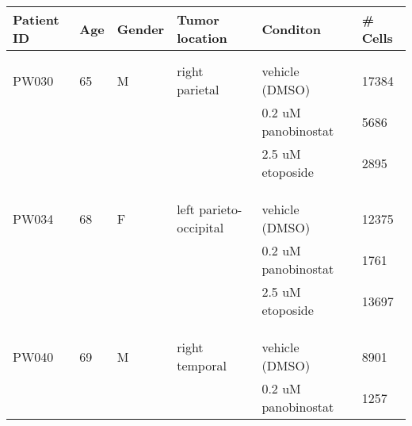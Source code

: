 \centering
\begin{tabular}[t]{llllll}
\toprule
Patient ID & Age & Gender & Tumor location & Conditon & \# Cells\\
\midrule
\cellcolor{gray!6}{PW029} & \cellcolor{gray!6}{52} & \cellcolor{gray!6}{F} & \cellcolor{gray!6}{splenial extension into left parietal} & \cellcolor{gray!6}{vehicle (DMSO)} & \cellcolor{gray!6}{1433}\\
\cellcolor{gray!6}{} & \cellcolor{gray!6}{} & \cellcolor{gray!6}{} & \cellcolor{gray!6}{} & \cellcolor{gray!6}{2.5 uM etoposide} & \cellcolor{gray!6}{3739}\\
PW030 & 65 & M & right parietal & vehicle (DMSO) & 17384\\
 &  &  &  & 0.2 uM panobinostat & 5686\\
 &  &  &  & 2.5 uM etoposide & 2895\\
\cellcolor{gray!6}{PW032} & \cellcolor{gray!6}{61} & \cellcolor{gray!6}{M} & \cellcolor{gray!6}{left frontal} & \cellcolor{gray!6}{vehicle (DMSO)} & \cellcolor{gray!6}{5003}\\
\cellcolor{gray!6}{} & \cellcolor{gray!6}{} & \cellcolor{gray!6}{} & \cellcolor{gray!6}{} & \cellcolor{gray!6}{0.2 uM panobinostat} & \cellcolor{gray!6}{738}\\
\cellcolor{gray!6}{} & \cellcolor{gray!6}{} & \cellcolor{gray!6}{} & \cellcolor{gray!6}{} & \cellcolor{gray!6}{2.5 uM etoposide} & \cellcolor{gray!6}{1034}\\
PW034 & 68 & F & left parieto-occipital & vehicle (DMSO) & 12375\\
 &  &  &  & 0.2 uM panobinostat & 1761\\
 &  &  &  & 2.5 uM etoposide & 13697\\
\cellcolor{gray!6}{PW036} & \cellcolor{gray!6}{56} & \cellcolor{gray!6}{M} & \cellcolor{gray!6}{right temporal} & \cellcolor{gray!6}{vehicle (DMSO)} & \cellcolor{gray!6}{10292}\\
\cellcolor{gray!6}{} & \cellcolor{gray!6}{} & \cellcolor{gray!6}{} & \cellcolor{gray!6}{} & \cellcolor{gray!6}{0.2 uM panobinostat} & \cellcolor{gray!6}{2558}\\
\cellcolor{gray!6}{} & \cellcolor{gray!6}{} & \cellcolor{gray!6}{} & \cellcolor{gray!6}{} & \cellcolor{gray!6}{2.5 uM etoposide} & \cellcolor{gray!6}{5460}\\
PW040 & 69 & M & right temporal & vehicle (DMSO) & 8901\\
 &  &  &  & 0.2 uM panobinostat & 1257\\
\bottomrule
\end{tabular}
